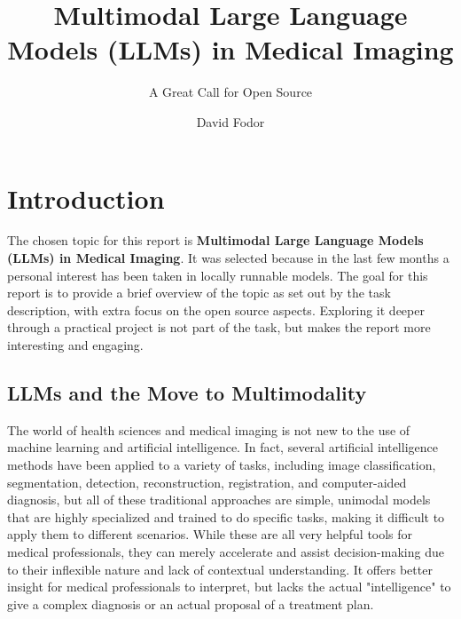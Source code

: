 \documentclass{imc-inf}
\title{Multimodal Large Language Models (LLMs) in Medical Imaging}
\subtitle{A Great Call for Open Source}
\author{David Fodor}
\begin{document}
\frontmatter\maketitle{}


%
\tableofcontents%
\clearpage


%
\listoftables
\clearpage


%
\listoffigures
\clearpage


\mainmatter%

\chapter{Introduction}\label{chap:introduction}

The chosen topic for this report is \textbf{Multimodal Large Language Models (LLMs) in Medical Imaging}.
It was selected because in the last few months a personal interest has been taken in locally runnable models.
The goal for this report is to provide a brief overview of the topic as set out by the task description, with extra focus on the open source aspects.
Exploring it deeper through a practical project is not part of the task, but makes the report more interesting and engaging.

\section{LLMs and the Move to Multimodality}

The world of health sciences and medical imaging is not new to the use of machine learning and artificial intelligence.
In fact, several artificial intelligence methods have been applied to a variety of tasks, including image classification, segmentation, detection, reconstruction, registration, and computer-aided diagnosis, but all of these traditional approaches are simple, unimodal models that are highly specialized and trained to do specific tasks, making it difficult to apply them to different scenarios.\cite{rajendran2025foundation}
While these are all very helpful tools for medical professionals, they can merely accelerate and assist decision-making due to their inflexible nature and lack of contextual understanding.
It offers better insight for medical professionals to interpret, but lacks the actual "intelligence" to give a complex diagnosis or an actual proposal of a treatment plan.
\end{document}
